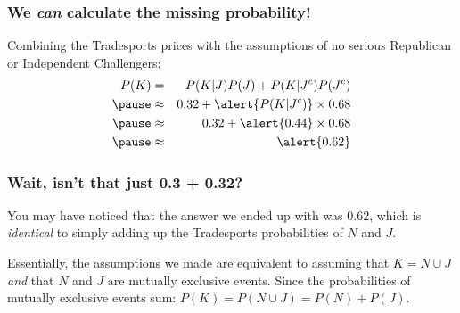 \documentclass[handout]{beamer}
\begin{document}
\begin{frame}
\frametitle{We \emph{can} calculate the missing probability!}
\normalsize
\vspace{2em}
\begin{alertblock}{Combining the Tradesports prices with the assumptions of no serious Republican or Independent Challengers:}
	\begin{eqnarray*}
		P(K)&=&  P(K|J)P(J) + P(K|J^c)P(J^c)\\
		\pause &\approx& 0.32 + \alert{P(K|J^c)} \times 0.68\\
		\pause &\approx& 0.32 + \alert{0.44} \times 0.68\\
		\pause &\approx& \alert{0.62} 
	\end{eqnarray*}
\end{alertblock}
\end{frame}
\begin{frame}
\frametitle{Wait, isn't that just 0.3 + 0.32?}
\normalsize
\vspace{2em}

You may have noticed that the answer we ended up with was 0.62, which is \emph{identical} to simply adding up the Tradesports probabilities of $N$ and $J$. 

\pause

\vspace{1em}
\alert{Essentially, the assumptions we made are equivalent to assuming that $K = N \cup J$ \emph{and} that $N$ and $J$ are mutually exclusive events. Since the probabilities of mutually exclusive events sum: $P(K) = P(N\cup J) = P(N) + P(J)$. }

\end{frame}
\end{document}
